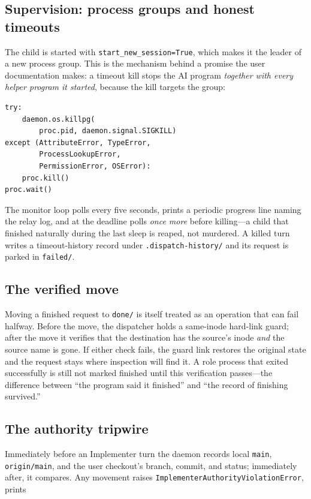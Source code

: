 \documentclass[10pt,aps,prd,twocolumn,nofootinbib]{revtex4-2}
\newcommand{\code}[1]{\texttt{#1}}
\newcommand{\file}[1]{\texttt{#1}}
\begin{document}
\subsection{Supervision: process groups and honest timeouts}

The child is started with \code{start\_new\_session=True}, which makes
it the leader of a new process group.  This is the mechanism behind a
promise the user documentation makes: a timeout kill stops the AI
program \emph{together with every helper program it started}, because
the kill targets the group:

\begin{verbatim}
try:
    daemon.os.killpg(
        proc.pid, daemon.signal.SIGKILL)
except (AttributeError, TypeError,
        ProcessLookupError,
        PermissionError, OSError):
    proc.kill()
proc.wait()
\end{verbatim}

The monitor loop polls every five seconds, prints a periodic progress
line naming the relay log, and at the deadline polls \emph{once more}
before killing---a child that finished naturally during the last sleep
is reaped, not murdered.  A killed turn writes a timeout-history
record under \file{.dispatch-history/} and its request is parked in
\file{failed/}.

\subsection{The verified move}

Moving a finished request to \file{done/} is itself treated as an
operation that can fail halfway.  Before the move, the dispatcher
holds a same-inode hard-link guard; after the move it verifies that
the destination has the source's inode \emph{and} the source name is
gone.  If either check fails, the guard link restores the original
state and the request stays where inspection will find it.  A role
process that exited successfully is still not marked finished until
this verification passes---the difference between ``the program said
it finished'' and ``the record of finishing survived.''

\subsection{The authority tripwire}

Immediately before an Implementer turn the daemon records local
\code{main}, \code{origin/main}, and the user checkout's branch,
commit, and status; immediately after, it compares.  Any movement
raises \code{ImplementerAuthorityViolationError}, prints
\end{document}
